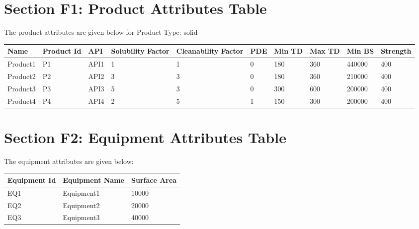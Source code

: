 \documentclass{article}
\begin{document}
        
                \newpage
                \section{Section F1: Product Attributes Table}         
                The product attributes are given below for Product Type: solid
                \begin{longtable}{ |p{1.5cm} |p{1.7cm} |p{1cm} |p{1.5cm} |p{1.7cm} |p{1cm} |p{1cm} |p{1cm} |p{1cm} |p{1.5cm} |}
                \hline

                Name & Product Id & API & Solubility Factor & Cleanability Factor & PDE & Min TD & Max TD & Min BS & Strength\\

                \hline

    Product1 & P1 & API1 & 1 & 1 & 0 & 180 & 360 & 440000 & 400\\
\hline
Product2 & P2 & API2 & 3 & 3 & 0 & 180 & 360 & 210000 & 400\\
\hline
Product3 & P3 & API3 & 5 & 3 & 0 & 300 & 600 & 200000 & 400\\
\hline
Product4 & P4 & API4 & 2 & 5 & 1 & 150 & 300 & 200000 & 400\\
\hline

    \end{longtable}
    
        
        \newpage
        \section{Section F2: Equipment Attributes Table}
        The equipment attributes are given below:
        \begin{longtable}[l]{ |p{3cm} |p{3cm} |p{2cm}|}
        \hline

        Equipment Id & Equipment Name & Surface Area\\

        \hline

    EQ1 & Equipment1 & 10000\\
\hline
EQ2 & Equipment2 & 20000\\
\hline
EQ3 & Equipment3 & 40000\\
\hline

    \end{longtable}
    
        
        \newpage
\end{document}
